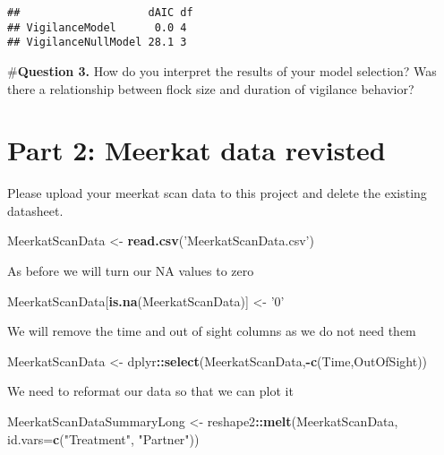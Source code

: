 \documentclass[]{book}
\newenvironment{Shaded}{\begin{snugshade}}{\end{snugshade}}
\newcommand{\DataTypeTok}[1]{\textcolor[rgb]{0.13,0.29,0.53}{#1}}
\newcommand{\KeywordTok}[1]{\textcolor[rgb]{0.13,0.29,0.53}{\textbf{#1}}}
\newcommand{\NormalTok}[1]{#1}
\newcommand{\OperatorTok}[1]{\textcolor[rgb]{0.81,0.36,0.00}{\textbf{#1}}}
\newcommand{\StringTok}[1]{\textcolor[rgb]{0.31,0.60,0.02}{#1}}
\begin{document}
\begin{verbatim}
##                    dAIC df
## VigilanceModel      0.0 4 
## VigilanceNullModel 28.1 3
\end{verbatim}

\#\textbf{Question 3.} How do you interpret the results of your model selection? Was there a relationship between flock size and duration of vigilance behavior?

\hypertarget{part-2-meerkat-data-revisted}{%
\section*{Part 2: Meerkat data revisted}\label{part-2-meerkat-data-revisted}}

Please upload your meerkat scan data to this project and delete the existing datasheet.

\begin{Shaded}
\begin{Highlighting}[]
\NormalTok{MeerkatScanData <-}\StringTok{ }\KeywordTok{read.csv}\NormalTok{(}\StringTok{'MeerkatScanData.csv'}\NormalTok{)}
\end{Highlighting}
\end{Shaded}

As before we will turn our NA values to zero

\begin{Shaded}
\begin{Highlighting}[]
\NormalTok{MeerkatScanData[}\KeywordTok{is.na}\NormalTok{(MeerkatScanData)] <-}\StringTok{ '0'}
\end{Highlighting}
\end{Shaded}

We will remove the time and out of sight columns as we do not need them

\begin{Shaded}
\begin{Highlighting}[]
\NormalTok{MeerkatScanData <-}\StringTok{ }\NormalTok{dplyr}\OperatorTok{::}\KeywordTok{select}\NormalTok{(MeerkatScanData,}\OperatorTok{-}\KeywordTok{c}\NormalTok{(Time,OutOfSight))}
\end{Highlighting}
\end{Shaded}

We need to reformat our data so that we can plot it

\begin{Shaded}
\begin{Highlighting}[]
\NormalTok{MeerkatScanDataSummaryLong <-}\StringTok{ }\NormalTok{reshape2}\OperatorTok{::}\KeywordTok{melt}\NormalTok{(MeerkatScanData, }\DataTypeTok{id.vars=}\KeywordTok{c}\NormalTok{(}\StringTok{"Treatment"}\NormalTok{, }\StringTok{"Partner"}\NormalTok{))}
\end{Highlighting}
\end{Shaded}
\end{document}
